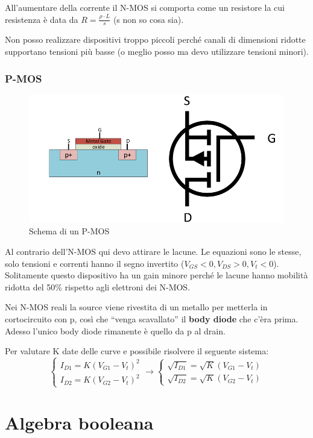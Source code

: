 \documentclass[
]{book}
\begin{document}
All'aumentare della corrente il N-MOS si comporta come un resistore la
cui resistenza è data da \(R=\frac{\rho\cdot L}{s}\) (s non so cosa
sia).

Non posso realizzare dispositivi troppo piccoli perché canali di
dimensioni ridotte supportano tensioni più basse (o meglio posso ma devo
utilizzare tensioni minori).

\subsection{P-MOS}\label{p-mos}

\begin{figure}
\centering
\includegraphics[width=0.5\linewidth,height=\textheight,keepaspectratio]{immagini/17.png}
\caption{Schema di un P-MOS}
\end{figure}

Al contrario dell'N-MOS qui devo attirare le lacune. Le equazioni sono
le stesse, solo tensioni e correnti hanno il segno invertito
(\(V_{GS}<0,V_{DS}>0,V_{t}<0\)). Solitamente questo dispositivo ha un
gain minore perché le lacune hanno mobilità ridotta del 50\% rispetto
agli elettroni dei N-MOS.

Nei N-MOS reali la source viene rivestita di un metallo per metterla in
cortocircuito con p, così che ``venga scavallato'' il \textbf{body
diode} che c'èra prima. Adesso l'unico body diode rimanente è quello da
p al drain.

Per valutare K date delle curve e possibile risolvere il seguente
sistema: \[
\begin{cases}
I_{D1}=K(V_{G1}-V_{t})^{2}\\
I_{D2}=K(V_{G2}-V_{t})^{2}\end{cases}\longrightarrow\begin{cases}\sqrt{I_{D1}}=\sqrt{K}(V_{G1}-V_{t})\\
\sqrt{I_{D2}}=\sqrt{K}(V_{G2}-V_{t})
\end{cases}
\]

\chapter{Algebra booleana}\label{algebra-booleana}
\end{document}
